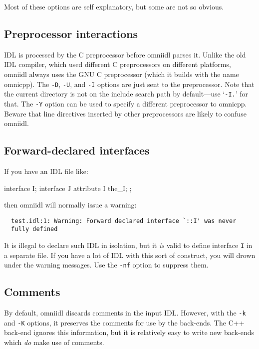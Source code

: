 \documentclass[11pt,twoside,a4paper]{book}
\newcommand{\intf}[1]{\texttt{#1}}
\newcommand{\cmdline}[1]{\texttt{#1}}
\begin{document}
\noindent Most of these options are self explanatory, but some are not
so obvious.

\subsection{Preprocessor interactions}

IDL is processed by the C preprocessor before omniidl parses it.
Unlike the old IDL compiler, which used different C preprocessors on
different platforms, omniidl always uses the GNU C preprocessor (which
it builds with the name omnicpp). The \cmdline{-D}, \cmdline{-U}, and
\cmdline{-I} options are just sent to the preprocessor. Note that the
current directory is not on the include search path by default---use
`\cmdline{-I.}' for that. The \cmdline{-Y} option can be used to
specify a different preprocessor to omnicpp. Beware that line
directives inserted by other preprocessors are likely to confuse
omniidl.


\subsection{Forward-declared interfaces}

If you have an IDL file like:

\begin{idllisting}
interface I;
interface J {
  attribute I the_I;
};
\end{idllisting}

\noindent then omniidl will normally issue a warning:

{\small
\begin{verbatim}
  test.idl:1: Warning: Forward declared interface `::I' was never
  fully defined
\end{verbatim}
}

\noindent It is illegal to declare such IDL in isolation, but it
\emph{is} valid to define interface \intf{I} in a separate file. If
you have a lot of IDL with this sort of construct, you will drown
under the warning messages. Use the \cmdline{-nf} option to suppress
them.


\subsection{Comments}

By default, omniidl discards comments in the input IDL. However, with
the \cmdline{-k} and \cmdline{-K} options, it preserves the comments
for use by the back-ends. The C++ back-end ignores this information,
but it is relatively easy to write new back-ends which \emph{do} make
use of comments.
\end{document}
